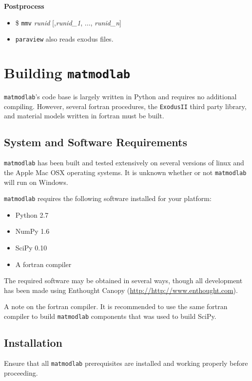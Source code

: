 \documentclass[12pt,report,strict]{SANDreport/SANDreport}
\newcommand{\mml}{\texttt{matmodlab}}
\newcommand{\mmv}{\texttt{mmv}}
\newcommand{\exodusii}{{\sc\texttt{ExodusII}}}
\newcommand{\paraview}[1]{{\sc\texttt{paraview}}}
\begin{document}
\textbf{Postprocess}
\begin{itemize}
  \item \$ \mmv{} \emph{runid} [,\emph{runid\_1}, $\ldots$,
  \emph{runid\_n}]
  \item \paraview{} also reads exodus files.
\end{itemize}


\chapter{Building \mml{}}
\label{chap:build}
\mml{}'s code base is largely written in Python and requires no additional
compiling. However, several fortran procedures, the \exodusii{} third party
library, and material models written in fortran must be built.

\section{System and Software Requirements}
\label{sec:sys}
\mml{} has been built and tested extensively on several versions of linux and
the Apple Mac OSX operating systems. It is unknown whether or not \mml{}
will run on Windows.

\mml{} requires the following software installed for your platform:

\begin{itemize}
  \item Python 2.7
  \item NumPy 1.6
  \item SciPy 0.10
  \item A fortran compiler
\end{itemize}

The required software may be obtained in several ways, though all development
has been made using Enthought Canopy (\url{http://http://www.enthought.com}).

A note on the fortran compiler.  It is recommended to use the same fortran
compiler to build \mml{} components that was used to build SciPy.

\section{Installation}
\label{sec:install}
Ensure that all \mml{} prerequisites are installed and working properly before
proceeding.
\end{document}
